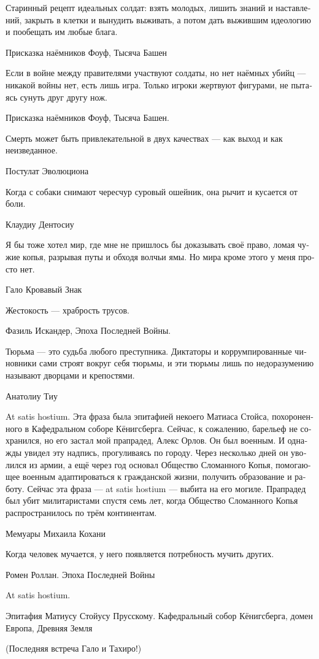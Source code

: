 \documentclass[a4paper,12pt,fleqn]{book}\usepackage{polyglossia}\setdefaultlanguage[babelshorthands=true]{russian}\setotherlanguage{english}\defaultfontfeatures{Ligatures=TeX,Mapping=tex-text}\usepackage{xcolor}\newcommand{\ml}[3]{#2}
\newcommand{\FM}{\footnotemark}
\newcommand{\FA}[1]{\footnotetext{#1 \emph{\ml{$0$}{---~Прим.~авт.}{---~Author.}}}}
\begin{document}
{\epigraph
{Старинный рецепт идеальных солдат: взять молодых, лишить знаний и наставлений, закрыть в клетки и вынудить выживать, а потом дать выжившим идеологию и пообещать им любые блага.}
{Присказка наёмников Фоуф, Тысяча Башен}

\epigraph
{Если в войне между правителями участвуют солдаты, но нет наёмных убийц --- никакой войны нет, есть лишь игра.
Только игроки жертвуют фигурами, не пытаясь сунуть друг другу нож.}
{Присказка наёмников Фоуф, Тысяча Башен.}

\epigraph
{Смерть может быть привлекательной в двух качествах --- как выход и как неизведанное.}
{Постулат Эволюциона}

\epigraph
{Когда с собаки снимают чересчур суровый ошейник, она рычит и кусается от боли.}
{Клаудиу Дентосиу}

\epigraph
{Я бы тоже хотел мир, где мне не пришлось бы доказывать своё право, ломая чужие копья, разрывая путы и обходя волчьи ямы.
Но мира кроме этого у меня просто нет.}
{Гало Кровавый Знак}

\epigraph
{Жестокость --- храбрость трусов.}
{Фазиль Искандер, Эпоха Последней Войны.}

\epigraph
{Тюрьма --- это судьба любого преступника.
Диктаторы и коррумпированные чиновники сами строят вокруг себя тюрьмы, и эти тюрьмы лишь по недоразумению называют дворцами и крепостями.}
{Анатолиу Тиу}

\epigraph
{At satis hostium.
Эта фраза была эпитафией некоего Матиаса Стойса, похороненного в Кафедральном соборе Кёнигсберга.
Сейчас, к сожалению, барельеф не сохранился, но его застал мой прапрадед, Алекс Орлов.
Он был военным.
И однажды увидел эту надпись, прогуливаясь по городу.
Через несколько дней он уволился из армии, а ещё через год основал Общество Сломанного Копья, помогающее военным адаптироваться к гражданской жизни, получить образование и работу.
Сейчас эта фраза --- at satis hostium --- выбита на его могиле.
Прапрадед был убит милитаристами спустя семь лет, когда Общество Сломанного Копья распространилось по трём континентам.}
{Мемуары Михаила Кохани}

\epigraph
{Когда человек мучается, у него появляется потребность мучить других.}
{Ромен Роллан.
Эпоха Последней Войны}

\epigraph
{At satis hostium\FM.}
{Эпитафия Матиусу Стойусу Прусскому.
Кафедральный собор Кёнигсберга, домен Европа, Древняя Земля}
\FA{
Но хватит врагов (эллатинский).
}

(Последняя встреча Гало и Тахиро!)

}
\end{document}
